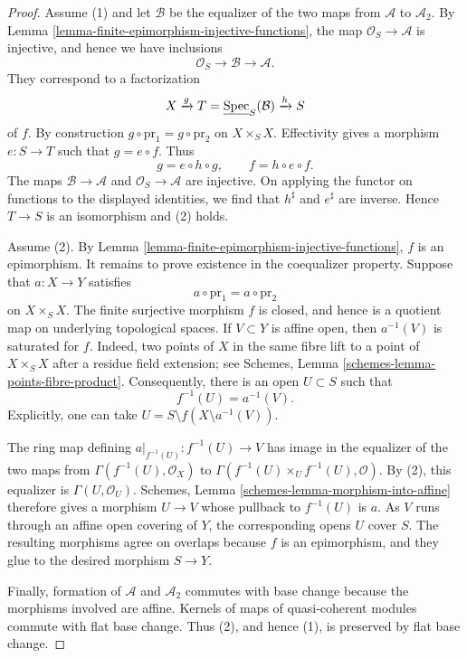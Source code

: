 \begin{proof}
Assume (1) and let $\mathcal{B}$ be the equalizer of the two maps from
$\mathcal{A}$ to $\mathcal{A}_2$. By
Lemma \ref{lemma-finite-epimorphism-injective-functions}, the map
$\mathcal{O}_S \to \mathcal{A}$ is injective, and hence we have inclusions
$$
\mathcal{O}_S \longrightarrow \mathcal{B} \longrightarrow \mathcal{A}.
$$
They correspond to a factorization
$$
X \xrightarrow{g} T = \underline{\mathop{\mathrm{Spec}}}_S(\mathcal{B})
\xrightarrow{h} S
$$
of $f$. By construction $g \circ \text{pr}_1 = g \circ \text{pr}_2$ on
$X \times_S X$. Effectivity gives a morphism $e : S \to T$ such that
$g = e \circ f$. Thus
$$
g = e \circ h \circ g, \qquad f = h \circ e \circ f.
$$
The maps $\mathcal{B} \to \mathcal{A}$ and
$\mathcal{O}_S \to \mathcal{A}$ are injective. On applying the functor on
functions to the displayed identities, we find that $h^\sharp$ and
$e^\sharp$ are inverse. Hence $T \to S$ is an isomorphism and (2) holds.

\medskip\noindent
Assume (2). By Lemma
\ref{lemma-finite-epimorphism-injective-functions}, $f$ is an epimorphism.
It remains to prove existence in the coequalizer property. Suppose that
$a : X \to Y$ satisfies
$$
a \circ \text{pr}_1 = a \circ \text{pr}_2
$$
on $X \times_S X$. The finite surjective morphism $f$ is closed, and hence
is a quotient map on underlying topological spaces. If $V \subset Y$ is
affine open, then $a^{-1}(V)$ is saturated for $f$. Indeed, two points of
$X$ in the same fibre lift to a point of $X \times_S X$ after a residue
field extension; see Schemes, Lemma
\ref{schemes-lemma-points-fibre-product}. Consequently, there is an open
$U \subset S$ such that
$$
f^{-1}(U) = a^{-1}(V).
$$
Explicitly, one can take
$U = S \setminus f(X \setminus a^{-1}(V))$.

The ring map defining $a|_{f^{-1}(U)} : f^{-1}(U) \to V$ has image in the
equalizer of the two maps from
$\Gamma(f^{-1}(U), \mathcal{O}_X)$ to
$\Gamma(f^{-1}(U) \times_U f^{-1}(U), \mathcal{O})$.
By (2), this equalizer is $\Gamma(U, \mathcal{O}_U)$. Schemes, Lemma
\ref{schemes-lemma-morphism-into-affine} therefore gives a morphism
$U \to V$ whose pullback to $f^{-1}(U)$ is $a$. As $V$ runs through an
affine open covering of $Y$, the corresponding opens $U$ cover $S$. The
resulting morphisms agree on overlaps because $f$ is an epimorphism, and
they glue to the desired morphism $S \to Y$.

Finally, formation of $\mathcal{A}$ and $\mathcal{A}_2$ commutes with base
change because the morphisms involved are affine. Kernels of maps of
quasi-coherent modules commute with flat base change. Thus (2), and hence
(1), is preserved by flat base change.
\end{proof}

